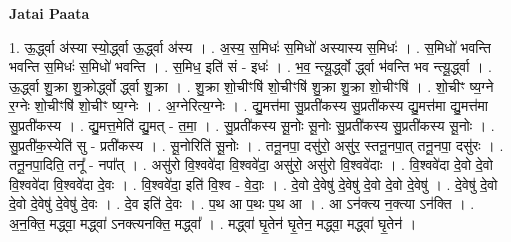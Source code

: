 \documentclass[17pt]{extarticle}
\begin{document}
\textbf{Jatai Paata} \newline

1. ऊ॒र्द्ध्वा अ॑स्या स्यो॒र्द्ध्वा ऊ॒र्द्ध्वा अ॑स्य । . अ॒स्य॒ स॒मिधः॑ स॒मिधो॑ अस्यास्य स॒मिधः॑ । . स॒मिधो॑ भवन्ति भवन्ति स॒मिधः॑ स॒मिधो॑ भवन्ति । . स॒मिध॒ इति॑ सं - इधः॑ । . भ॒व॒ न्त्यू॒र्द्ध्वो र्द्ध्वा भ॑वन्ति भव न्त्यू॒र्द्ध्वा । . ऊ॒र्द्ध्वा शु॒क्रा शु॒क्रोर्द्ध्वो र्द्ध्वा शु॒क्रा । . शु॒क्रा शो॒चीꣳषि॑ शो॒चीꣳषि॑ शु॒क्रा शु॒क्रा शो॒चीꣳषि॑ । . शो॒चीꣳ ष्य॒ग्ने र॒ग्नेः शो॒चीꣳषि॑ शो॒चीꣳ ष्य॒ग्नेः । . अ॒ग्नेरित्य॒ग्नेः । . द्यु॒मत्त॑मा सु॒प्रती॑कस्य सु॒प्रती॑कस्य द्यु॒मत्त॑मा द्यु॒मत्त॑मा सु॒प्रती॑कस्य । . द्यु॒मत्त॒मेति॑ द्यु॒मत् - त॒मा॒ । . सु॒प्रती॑कस्य सू॒नोः सू॒नोः सु॒प्रती॑कस्य सु॒प्रती॑कस्य सू॒नोः । . सु॒प्रती॑क॒स्येति॑ सु - प्रती॑कस्य । . सू॒नोरिति॑ सू॒नोः । . तनू॒नपा॒ दसु॑रो॒ असु॑र॒ स्तनू॒नपा॒त् तनू॒नपा॒ दसु॑रः । . तनू॒नपा॒दिति॒ तनू᳚ - नपा᳚त् । . असु॑रो वि॒श्ववे॑दा वि॒श्ववे॑दा॒ असु॑रो॒ असु॑रो वि॒श्ववे॑दाः । . वि॒श्ववे॑दा दे॒वो दे॒वो वि॒श्ववे॑दा वि॒श्ववे॑दा दे॒वः । . वि॒श्ववे॑दा॒ इति॑ वि॒श्व - वे॒दाः॒ । . दे॒वो दे॒वेषु॑ दे॒वेषु॑ दे॒वो दे॒वो दे॒वेषु॑ । . दे॒वेषु॑ दे॒वो दे॒वो दे॒वेषु॑ दे॒वेषु॑ दे॒वः । . दे॒व इति॑ दे॒वः । . प॒थ आ प॒थः प॒थ आ । . आ ऽन॑क्त्य न॒क्त्या ऽन॑क्ति । . अ॒न॒क्ति॒ मद्ध्वा॒ मद्ध्वा॑ ऽनक्त्यनक्ति॒ मद्ध्वा᳚ । . मद्ध्वा॑ घृ॒तेन॑ घृ॒तेन॒ मद्ध्वा॒ मद्ध्वा॑ घृ॒तेन॑ । \newline
\end{document}
